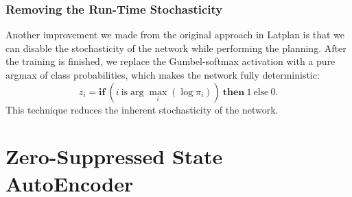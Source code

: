 \subsubsection{Removing the Run-Time Stochasticity}
\label{argmax}

Another improvement we made from the original approach in Latplan is that we can
disable the stochasticity of the network while performing the planning.
After the training is finished, we replace the Gumbel-softmax activation with
a pure argmax of class probabilities, which makes the network fully deterministic:
\[
 z_{i} = \textbf{if}\ (i\ \text{is} \arg \max_i (\log \pi_{i}))\ \textbf{then}\ 1\ \text{else}\ 0.
\]
% 
This technique reduces the inherent stochasticity of the network.

\section{Zero-Suppressed State AutoEncoder}
\label{zsae}

